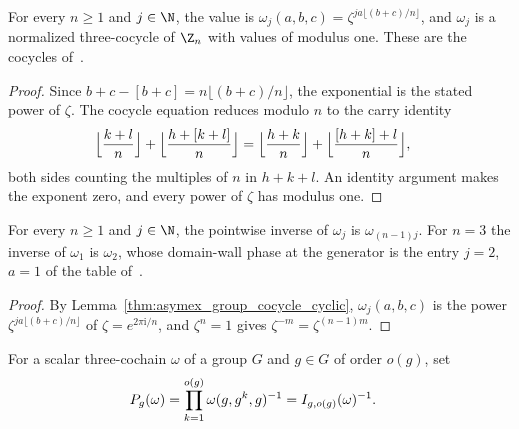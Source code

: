 \begin{lemma}
    \label{thm:asymex_group_cocycle_cyclic}
    \leanok
    For every $n\geq1$ and $j\in\N$, the value is
    $\omega_j(a,b,c)=\zeta^{ja\lfloor(b+c)/n\rfloor}$, and $\omega_j$ is a
    normalized three-cocycle of $\Z_n$ with values of modulus one. These are
    the cocycles of~\cite[Section~IV.D]{GarreRubioSchuch2024DomainWall}.
\end{lemma}
\begin{proof}
    \leanok
    Since $b+c-[b+c]=n\lfloor(b+c)/n\rfloor$, the exponential is the stated
    power of $\zeta$. The cocycle equation reduces modulo $n$ to the carry
    identity
    \begin{align}
        \Bigl\lfloor\frac{k+l}{n}\Bigr\rfloor
        +\Bigl\lfloor\frac{h+[k+l]}{n}\Bigr\rfloor
         & =\Bigl\lfloor\frac{h+k}{n}\Bigr\rfloor
        +\Bigl\lfloor\frac{[h+k]+l}{n}\Bigr\rfloor,
        \notag
    \end{align}
    both sides counting the multiples of $n$ in $h+k+l$. An identity
    argument makes the exponent zero, and every power of $\zeta$ has
    modulus one.
\end{proof}

\begin{lemma}
    \label{thm:asymex_z3anomalous_cocycle_family_class}
    \leanok
    For every $n\geq1$ and $j\in\N$, the pointwise inverse of $\omega_j$ is
    $\omega_{(n-1)j}$. For $n=3$ the inverse of $\omega_1$ is $\omega_2$, whose
    domain-wall phase at the generator is the entry $j=2$, $a=1$ of the table
    of~\cite{GarreRubioSchuch2024DomainWall}.
\end{lemma}
\begin{proof}
    \leanok
    By Lemma~\ref{thm:asymex_group_cocycle_cyclic}, $\omega_j(a,b,c)$ is the
    power $\zeta^{ja\lfloor(b+c)/n\rfloor}$ of $\zeta=e^{2\pi\mathrm{i}/n}$, and
    $\zeta^{n}=1$ gives $\zeta^{-m}=\zeta^{(n-1)m}$.
\end{proof}

\begin{definition}
    \label{def:asymex_group_cocycle_domain_wall_phase}
    \leanok
    For a scalar three-cochain $\omega$ of a group $G$ and $g\in G$ of order
    $o(g)$, set
    \begin{align}
        P_g(\omega) & =\prod_{k=1}^{o(g)}\omega(g,g^k,g)^{-1}
        =I_{g,o(g)}(\omega)^{-1}.
        \notag
    \end{align}
\end{definition}

